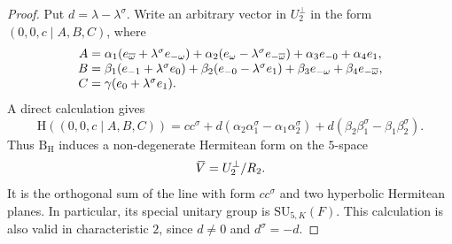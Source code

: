 \documentclass{amsart}
\def\ovV{\mathord{\mbox{\hspace*{0pt}}\,\overline{\!V\!\!\;}\!\:}\mbox{\hspace*{0pt}}}
\newcommand{\SU}{\mathrm{SU}}
\renewcommand{\bar}{\overline}
\newcommand{\B}{\mathrm{B}}
\renewcommand{\H}{\mathrm{H}}
\newcommand{\s}{\sigma}
\theoremstyle{plain}
\numberwithin{theorem}{section}
\theoremstyle{definition}
\begin{document}
\begin{proof}
	Put $d=\lambda-\lambda^{\s}$. Write an arbitrary vector in $U_2^{\perp}$ in the
	form $(0,0,c\mid A,B,C)$, where
	\begin{equation*}
		\begin{array}{r@{\;}c@{\;}l}
			A&=&\alpha_1(e_{\bar{\omega}}+\lambda^{\s}e_{-\omega})+
			\alpha_2(e_{\omega}-\lambda^{\s}e_{-\bar{\omega}})+
			\alpha_3e_{-0}+\alpha_4e_1,\\
			B&=&\beta_1(e_{-1}+\lambda^{\s}e_0)+
			\beta_2(e_{-0}-\lambda^{\s}e_1)+
			\beta_3e_{-\omega}+\beta_4e_{-\bar{\omega}},\\
			C&=&\gamma(e_0+\lambda^{\s}e_1).
		\end{array}
	\end{equation*}
	A direct calculation gives
	\begin{equation}
		\label{eq:7_H_on_U2perp}
		\H((0,0,c\mid A,B,C))=cc^{\s}
		+d(\alpha_2\alpha_1^{\s}-\alpha_1\alpha_2^{\s})
		+d(\beta_2\beta_1^{\s}-\beta_1\beta_2^{\s}).
	\end{equation}
	Thus $\B_{\H}$ induces a non-degenerate Hermitean form on the $5$-space
	\begin{equation}
		\ovV=U_2^{\perp}/R_2.
	\end{equation}
	It is the orthogonal sum of the line with form $cc^{\s}$ and two hyperbolic
	Hermitean planes. In particular, its special unitary group is $\SU_{5,K}(F)$.
	This calculation is also valid in characteristic $2$, since $d\neq0$ and
	$d^{\s}=-d$.


\end{proof}
\end{document}
